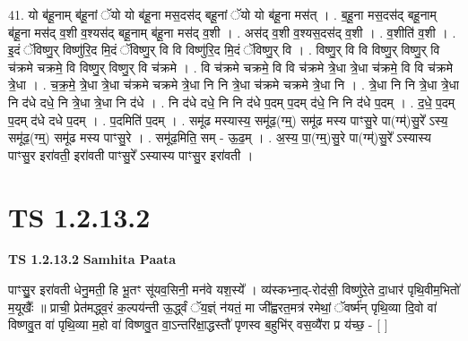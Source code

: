 \documentclass[17pt]{extarticle}
\begin{document}
41. यो ब॑हू॒नाम् ब॑हू॒नां ॅयो यो ब॑हू॒ना मस॒दस॑द् बहू॒नां ॅयो यो ब॑हू॒ना मस॑त् । . ब॒हू॒ना मस॒दस॑द् बहू॒नाम् ब॑हू॒ना मस॑द् व॒शी व॒श्यस॑द् बहू॒नाम् ब॑हू॒ना मस॑द् व॒शी । . अस॑द् व॒शी व॒श्यस॒दस॑द् व॒शी । . व॒शीति॑ व॒शी । . इ॒दं ॅविष्णु॒र् विष्णु॑रि॒द मि॒दं ॅविष्णु॒र् वि वि विष्णु॑रि॒द मि॒दं ॅविष्णु॒र् वि । . विष्णु॒र् वि वि विष्णु॒र् विष्णु॒र् वि च॑क्रमे चक्रमे॒ वि विष्णु॒र् विष्णु॒र् वि च॑क्रमे । . वि च॑क्रमे चक्रमे॒ वि वि च॑क्रमे त्रे॒धा त्रे॒धा च॑क्रमे॒ वि वि च॑क्रमे त्रे॒धा । . च॒क्र॒मे॒ त्रे॒धा त्रे॒धा च॑क्रमे चक्रमे त्रे॒धा नि नि त्रे॒धा च॑क्रमे चक्रमे त्रे॒धा नि । . त्रे॒धा नि नि त्रे॒धा त्रे॒धा नि द॑धे दधे॒ नि त्रे॒धा त्रे॒धा नि द॑धे । . नि द॑धे दधे॒ नि नि द॑धे प॒दम् प॒दम् द॑धे॒ नि नि द॑धे प॒दम् । . द॒धे॒ प॒दम् प॒दम् द॑धे दधे प॒दम् । . प॒दमिति॑ प॒दम् । . समू॑ढ मस्यास्य॒ समू॑ढ॒(ग्म्॒) समू॑ढ मस्य पाꣳसु॒रे पा(ग्म्॑)सु॒रे᳚ ऽस्य॒ समू॑ढ॒(ग्म्॒) समू॑ढ मस्य पाꣳसु॒रे । . समू॑ढ॒मिति॒ सम् - ऊ॒ढ॒म् । . अ॒स्य॒ पा॒(ग्म्॒)सु॒रे पा(ग्म्॑)सु॒रे᳚ ऽस्यास्य पाꣳसु॒र इरा॑वती॒ इरा॑वती पाꣳसु॒रे᳚ ऽस्यास्य पाꣳसु॒र इरा॑वती । \newline
\pagebreak
{}
\section*{ TS 1.2.13.2 }

\textbf{TS 1.2.13.2 } \newline
\textbf{Samhita Paata} \newline

पाꣳसु॒॒र इरा॑वती धेनु॒मती॒ हि भू॒तꣳ सू॑यव॒सिनी॒ मन॑वे यश॒स्ये᳚ । व्य॑स्कभ्ना॒द्-रोद॑सी॒ विष्णु॑रे॒ते दा॒धार॑ पृथि॒वीम॒भितो॑ म॒यूखैः᳚ ॥ प्राची॒ प्रेत॑मद्ध्व॒रं क॒ल्पय॑न्ती ऊ॒र्द्ध्वं ॅय॒ज्ञ्ं न॑यतं॒ मा जी᳚ह्वरत॒मत्र॑ रमेथां॒ ॅवर्ष्म॑न् पृथि॒व्या दि॒वो वा॑ विष्णवु॒त वा॑ पृथि॒व्या म॒हो वा॑ विष्णवु॒त वा॒ऽन्तरि॑क्षा॒द्धस्तौ॑ पृणस्व ब॒हुभि॑र् वस॒व्यै॑रा प्र य॑च्छ॒ - [ ] \newline
\end{document}
